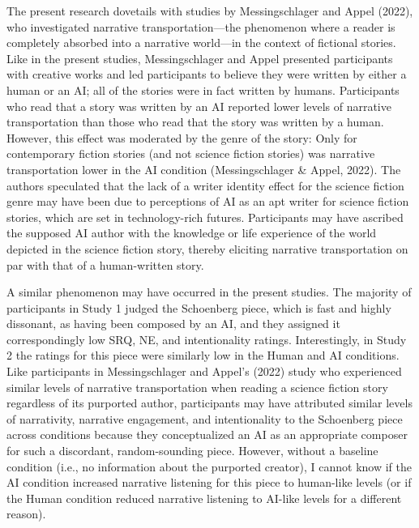 \documentclass[12pt,twoside]{reedthesis}
\begin{document}
The present research dovetails with studies by Messingschlager and Appel (2022), who investigated narrative transportation—the phenomenon where a reader is completely absorbed into a narrative world—in the context of fictional stories. Like in the present studies, Messingschlager and Appel presented participants with creative works and led participants to believe they were written by either a human or an AI; all of the stories were in fact written by humans. Participants who read that a story was written by an AI reported lower levels of narrative transportation than those who read that the story was written by a human. However, this effect was moderated by the genre of the story: Only for contemporary fiction stories (and not science fiction stories) was narrative transportation lower in the AI condition (Messingschlager \& Appel, 2022). The authors speculated that the lack of a writer identity effect for the science fiction genre may have been due to perceptions of AI as an apt writer for science fiction stories, which are set in technology-rich futures. Participants may have ascribed the supposed AI author with the knowledge or life experience of the world depicted in the science fiction story, thereby eliciting narrative transportation on par with that of a human-written story.

A similar phenomenon may have occurred in the present studies. The majority of participants in Study 1 judged the Schoenberg piece, which is fast and highly dissonant, as having been composed by an AI, and they assigned it correspondingly low SRQ, NE, and intentionality ratings. Interestingly, in Study 2 the ratings for this piece were similarly low in the Human and AI conditions. Like participants in Messingschlager and Appel’s (2022) study who experienced similar levels of narrative transportation when reading a science fiction story regardless of its purported author, participants may have attributed similar levels of narrativity, narrative engagement, and intentionality to the Schoenberg piece across conditions because they conceptualized an AI as an appropriate composer for such a discordant, random-sounding piece. However, without a baseline condition (i.e., no information about the purported creator), I cannot know if the AI condition increased narrative listening for this piece to human-like levels (or if the Human condition reduced narrative listening to AI-like levels for a different reason).
\end{document}
